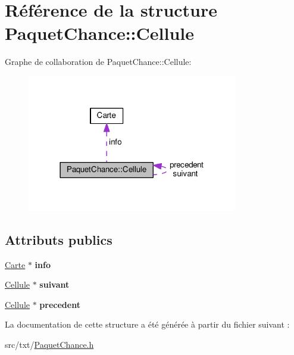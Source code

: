 \hypertarget{structPaquetChance_1_1Cellule}{}\section{Référence de la structure Paquet\+Chance\+:\+:Cellule}
\label{structPaquetChance_1_1Cellule}


Graphe de collaboration de Paquet\+Chance\+:\+:Cellule\+:
\nopagebreak
\begin{figure}[H]
\begin{center}
\leavevmode
\includegraphics[width=261pt]{structPaquetChance_1_1Cellule__coll__graph}
\end{center}
\end{figure}
\subsection*{Attributs publics}
\begin{DoxyCompactItemize}
\item 
\hyperlink{classCarte}{Carte} $\ast$ {\bfseries info}\hypertarget{structPaquetChance_1_1Cellule_a869e37179243ec2b6056f8a83a8e270e}{}\label{structPaquetChance_1_1Cellule_a869e37179243ec2b6056f8a83a8e270e}

\item 
\hyperlink{structPaquetChance_1_1Cellule}{Cellule} $\ast$ {\bfseries suivant}\hypertarget{structPaquetChance_1_1Cellule_a1e2292d5d6cfbc4377a4a7b0b3a9c6f4}{}\label{structPaquetChance_1_1Cellule_a1e2292d5d6cfbc4377a4a7b0b3a9c6f4}

\item 
\hyperlink{structPaquetChance_1_1Cellule}{Cellule} $\ast$ {\bfseries precedent}\hypertarget{structPaquetChance_1_1Cellule_a7f9c2860bbc80e0be45c3b280cda7730}{}\label{structPaquetChance_1_1Cellule_a7f9c2860bbc80e0be45c3b280cda7730}

\end{DoxyCompactItemize}


La documentation de cette structure a été générée à partir du fichier suivant \+:\begin{DoxyCompactItemize}
\item 
src/txt/\hyperlink{PaquetChance_8h}{Paquet\+Chance.\+h}\end{DoxyCompactItemize}

